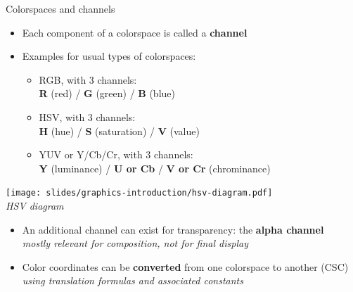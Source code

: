 \begin{frame}{Colorspaces and channels}
  \begin{minipage}[b]{0.7\textwidth}
    \begin{itemize}
    \item Each component of a colorspace is called a \textbf{channel}
    \item Examples for usual types of colorspaces:
      \begin{itemize}
      \item RGB, with 3 channels:\\ \textbf{R} (red) / \textbf{G} (green) / \textbf{B} (blue)
      \item HSV, with 3 channels:\\ \textbf{H} (hue) / \textbf{S} (saturation) / \textbf{V} (value)
      \item YUV or Y/Cb/Cr, with 3 channels:\\ \textbf{Y} (luminance) / \textbf{U or Cb} / \textbf{V or Cr} (chrominance)
      \end{itemize}
    \end{itemize}
  \end{minipage}
  \hfill
  \begin{minipage}[b]{0.25\textwidth}
    \centering
    \texttt{[image: slides/graphics-introduction/hsv-diagram.pdf]}\\
    \vspace{-1em}
    \textit{\small HSV diagram}
    \vspace{0.25em}
  \end{minipage}
  \begin{itemize}
  \item An additional channel can exist for transparency: the \textbf{alpha channel}\\
  \textit{mostly relevant for composition, not for final display}
  \item Color coordinates can be \textbf{converted} from one colorspace to another (CSC)\\
  \textit{using translation formulas and associated constants}
  \end{itemize}
\end{frame}

